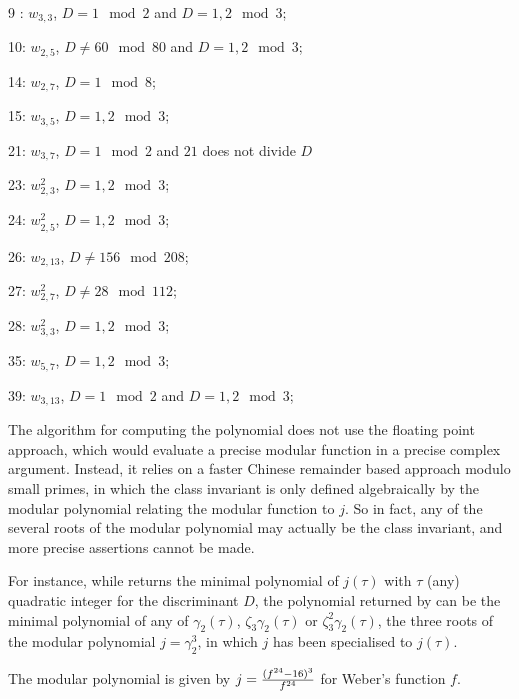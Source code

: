 \item 9 : $w_{3,3}$, $D = 1 \mod 2$ and $D = 1,2 \mod 3$;

\item 10: $w_{2,5}$, $D \neq 60 \mod 80$ and $D = 1,2 \mod 3$;

\item 14: $w_{2,7}$, $D = 1 \mod 8$;

\item 15: $w_{3,5}$, $D = 1,2 \mod 3$;

\item 21: $w_{3,7}$, $D = 1 \mod 2$ and $21$ does not divide $D$

\item 23: $w_{2,3}^2$, $D = 1,2 \mod 3$;

\item 24: $w_{2,5}^2$, $D = 1,2 \mod 3$;

\item 26: $w_{2,13}$, $D \neq 156 \mod 208$;

\item 27: $w_{2,7}^2$, $D\neq 28 \mod 112$;

\item 28: $w_{3,3}^2$, $D = 1,2 \mod 3$;

\item 35: $w_{5,7}$, $D = 1,2 \mod 3$;

\item 39: $w_{3,13}$, $D = 1 \mod 2$ and $D = 1,2 \mod 3$;

The algorithm for computing the polynomial does not use the floating point
approach, which would evaluate a precise modular function in a precise
complex argument. Instead, it relies on a faster Chinese remainder based
approach modulo small primes, in which the class invariant is only defined
algebraically by the modular polynomial relating the modular function to $j$.
So in fact, any of the several roots of the modular polynomial may actually
be the class invariant, and more precise assertions cannot be made.

For instance, while  returns the minimal polynomial of
$j(\tau)$ with $\tau$ (any) quadratic integer for the discriminant $D$,
the polynomial returned by  can be the minimal polynomial
of any of $\gamma_2 (\tau)$, $\zeta_3 \gamma_2 (\tau)$ or
$\zeta_3^2 \gamma_2 (\tau)$, the three roots of the modular polynomial
$j = \gamma_2^3$, in which $j$ has been specialised to $j (\tau)$.

The modular polynomial is given by
$j = {(f^{24}-16)^3 \over f^{24}}$ for Weber's function $f$.

